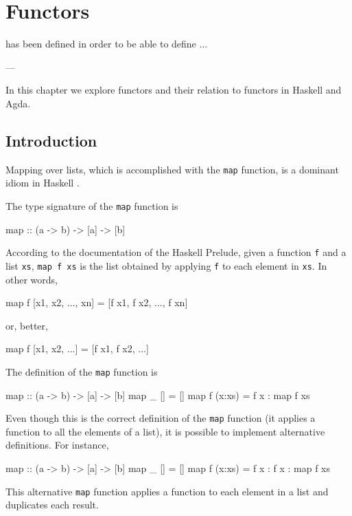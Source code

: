 \chapter{Functors}
\label{chap:functors}

\epigraph{
   has been defined in order to be able to
  define ...
}{---\textcite[18]{maclane-1998}}

In this chapter we explore functors and their relation to functors in
Haskell and Agda.

\section{Introduction}
\label{sec:functors-introduction}


Mapping over lists, which is accomplished with the \texttt{map}
function, is a dominant idiom in Haskell \parencite{lipovaca-2011}.

The type signature of the \texttt{map} function is
\begin{codehaskell}
  map :: (a -> b) -> [a] -> [b]
\end{codehaskell}
According to the documentation of the Haskell Prelude, given a
function \texttt{f} and a list \texttt{xs}, \texttt{map f xs} is the
list obtained by applying \texttt{f} to each element in \texttt{xs}.
In other words,
\begin{codehaskell}
  map f [x1, x2, ..., xn] = [f x1, f x2, ..., f xn]
\end{codehaskell}
or, better,
\begin{codehaskell}
  map f [x1, x2, ...] = [f x1, f x2, ...]
\end{codehaskell}

The definition of the \texttt{map} function is
\begin{codehaskell}
  map :: (a -> b) -> [a] -> [b]
  map _ []     = []
  map f (x:xs) = f x : map f xs
\end{codehaskell}
Even though this is the correct definition of the \texttt{map}
function (it applies a function to all the elements of a list), it is
possible to implement alternative definitions. For instance,
\begin{codehaskell}
  map :: (a -> b) -> [a] -> [b]
  map _ []     = []
  map f (x:xs) = f x : f x : map f xs
\end{codehaskell}
This alternative \texttt{map} function applies a function to each
element in a list and duplicates each result.

